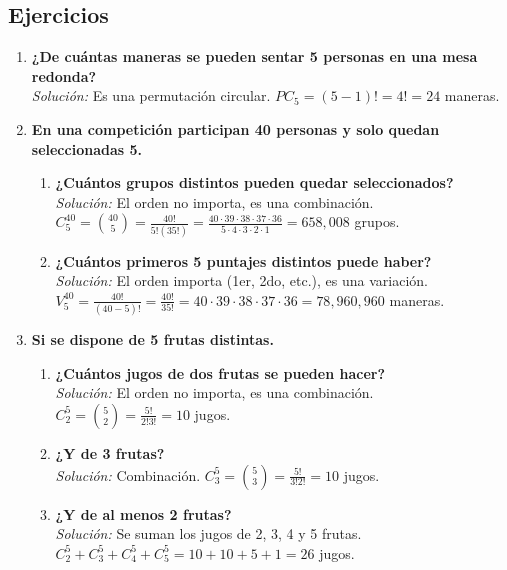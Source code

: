 \documentclass[12pt, letterpaper]{article}
\begin{document}
\subsection{Ejercicios}
\begin{enumerate}
    \item \textbf{¿De cuántas maneras se pueden sentar 5 personas en una mesa redonda?} \\
    \textit{Solución:} Es una permutación circular. $PC_5 = (5-1)! = 4! = 24$ maneras.

    \item \textbf{En una competición participan 40 personas y solo quedan seleccionadas 5.}
        \begin{enumerate}
            \item \textbf{¿Cuántos grupos distintos pueden quedar seleccionados?} \\
            \textit{Solución:} El orden no importa, es una combinación. \\
            $C_5^{40} = \binom{40}{5} = \frac{40!}{5!(35!)} = \frac{40 \cdot 39 \cdot 38 \cdot 37 \cdot 36}{5 \cdot 4 \cdot 3 \cdot 2 \cdot 1} = 658,008$ grupos.
            \item \textbf{¿Cuántos primeros 5 puntajes distintos puede haber?} \\
            \textit{Solución:} El orden importa (1er, 2do, etc.), es una variación. \\
            $V_5^{40} = \frac{40!}{(40-5)!} = \frac{40!}{35!} = 40 \cdot 39 \cdot 38 \cdot 37 \cdot 36 = 78,960,960$ maneras.
        \end{enumerate}

    \item \textbf{Si se dispone de 5 frutas distintas.}
        \begin{enumerate}
            \item \textbf{¿Cuántos jugos de dos frutas se pueden hacer?} \\
            \textit{Solución:} El orden no importa, es una combinación. \\
            $C_2^5 = \binom{5}{2} = \frac{5!}{2!3!} = 10$ jugos.
            \item \textbf{¿Y de 3 frutas?} \\
            \textit{Solución:} Combinación. $C_3^5 = \binom{5}{3} = \frac{5!}{3!2!} = 10$ jugos.
            \item \textbf{¿Y de al menos 2 frutas?} \\
            \textit{Solución:} Se suman los jugos de 2, 3, 4 y 5 frutas. \\
            $C_2^5 + C_3^5 + C_4^5 + C_5^5 = 10 + 10 + 5 + 1 = 26$ jugos.
        \end{enumerate}
\end{enumerate}
\end{document}
